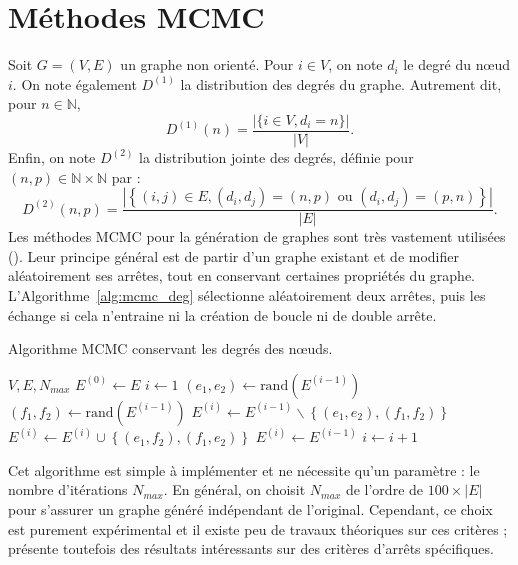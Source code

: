 \documentclass[a4paper]{article}
\begin{document}
\section{Méthodes MCMC}
\label{sec:methodes_mcmc}
    Soit $G = (V, E)$ un graphe non orienté. Pour $i \in V$, on note $d_i$ le
    degré du n\oe{}ud $i$. On note également $D^{(1)}$ la distribution des
    degrés du graphe. Autrement dit, pour $n \in \mathbb{N}$,
    \[
        D^{(1)}(n) = \frac{|\{i \in V, d_i = n\}|}{|V|}.
    \]
    Enfin, on note $D^{(2)}$ la distribution jointe des degrés, définie pour
    $(n, p) \in \mathbb{N} \times \mathbb{N}$ par :
    \[
        D^{(2)}(n, p) = \frac{|\left\{ (i, j) \in E, (d_i, d_j) = (n, p)
            \text{ ou } (d_i, d_j) = (p, n)\right\}|}{|E|}.
    \]
    Les méthodes MCMC pour la génération de graphes sont très vastement
    utilisées (\cite{rao1996markov}). Leur principe général est de partir
    d'un graphe existant et de modifier aléatoirement ses arrêtes, tout en
    conservant certaines propriétés du graphe. L'Algorithme~\ref{alg:mcmc_deg}
    sélectionne aléatoirement deux arrêtes, puis les échange si cela
    n'entraine ni la création de boucle ni de double arrête.

    \begin{algorithm}
        \caption{Algorithme MCMC conservant les degrés des n\oe{}uds.}
        \label{alg:mcmc_deg}
        \begin{algorithmic}[1]
            \Require $V, E, N_{max}$
            \State $E^{(0)} \gets E$
            \State $i \gets 1$
                \State $(e_1, e_2) \gets \text{rand}(E^{(i-1)})$
                \State $(f_1, f_2) \gets \text{rand}(E^{(i-1)})$
                    \State $E^{(i)} \gets E^{(i-1)} \backslash \left\{ (e_1, e_2), (f_1, f_2) \right\}$
                    \State $E^{(i)} \gets E^{(i)} \cup \left\{ (e_1, f_2), (f_1, e_2) \right\}$
                \Else
                    \State $E^{(i)} \gets E^{(i-1)}$
                \EndIf
                \State $i \gets i + 1$
            \EndWhile
        \end{algorithmic}
    \end{algorithm}

    Cet algorithme est simple à implémenter et ne nécessite qu'un paramètre :
    le nombre d'itérations $N_{max}$. En général, on choisit $N_{max}$ de
    l'ordre de $100 \times |E|$ pour s'assurer un graphe généré indépendant de
    l'original. Cependant, ce choix est purement expérimental et il existe peu
    de travaux théoriques sur ces critères ; \cite{ray2012we} présente
    toutefois des résultats intéressants sur des critères d'arrêts spécifiques.
\end{document}
